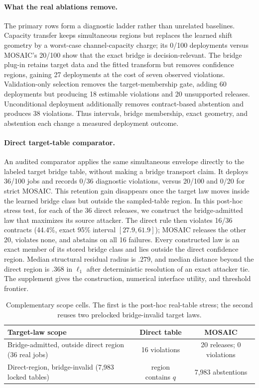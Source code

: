 \paragraph{What the real ablations remove.}
The primary rows form a diagnostic ladder rather than unrelated baselines.
Capacity transfer keeps simultaneous regions but replaces the learned shift
geometry by a worst-case channel-capacity charge; its 0/100 deployments versus
MOSAIC's 20/100 show that the exact bridge is decision-relevant. The bridge
plug-in retains target data and the fitted transform but removes confidence
regions, gaining 27 deployments at the cost of seven observed violations.
Validation-only selection removes the target-membership gate, adding 60
deployments but producing 18 estimable violations and 20 unsupported releases.
Unconditional deployment additionally removes contract-based abstention and
produces 38 violations. Thus intervals, bridge membership, exact geometry, and
abstention each change a measured deployment outcome.

\paragraph{Direct target-table comparator.}
An audited comparator applies the same simultaneous envelope directly to the
labeled target bridge table, without making a bridge transport claim. It
deploys 36/100 jobs and records 0/36 diagnostic violations, versus 20/100 and
0/20 for strict MOSAIC. This retention gain disappears once the target law
moves inside the learned bridge class but outside the sampled-table region.
In this post-hoc stress test, for each of the 36 direct releases, we construct
the bridge-admitted law that
maximizes its source attacker. The direct rule then violates 16/36 contracts
(44.4\%, exact 95\% interval $[27.9,61.9]$); MOSAIC releases the other 20,
violates none, and abstains on all 16 failures. Every constructed law is an
exact member of its stored bridge class and lies outside the direct confidence
region. Median structural residual radius is $.279$, and median distance beyond
the direct region is $.368$ in $\ell_1$ after deterministic resolution of an
exact attacker tie. The supplement gives the construction,
numerical interface utility, and threshold frontier.

\begin{table}[t]
\centering
\scriptsize
\setlength{\tabcolsep}{3.2pt}
\begin{tabular}{p{}cc}
\hline
Target-law scope & Direct table & MOSAIC \\
\hline
Bridge-admitted, outside direct region (36 real jobs) & 16 violations & 20 releases; 0 violations \\
Direct-region, bridge-invalid (7,983 locked tables) & region contains $q$ & 7,983 abstentions \\
\hline
\end{tabular}
\caption{Complementary scope cells. The first is the post-hoc real-table
stress; the second reuses two prelocked bridge-invalid target laws.}
\label{tab:scope-cells}
\end{table}


